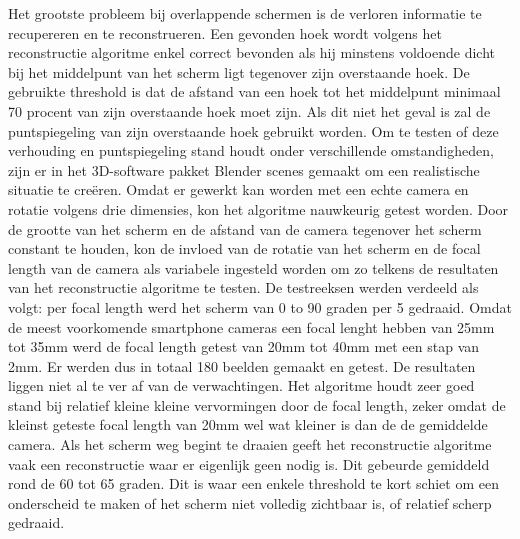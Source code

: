 Het grootste probleem bij overlappende schermen is de verloren informatie te recupereren en te reconstrueren. Een gevonden hoek wordt volgens het reconstructie algoritme enkel correct bevonden als hij minstens voldoende dicht bij het middelpunt van het scherm ligt tegenover zijn overstaande hoek. De gebruikte threshold is dat de afstand van een hoek tot het middelpunt minimaal 70 procent van zijn overstaande hoek moet zijn. Als dit niet het geval is zal de puntspiegeling van zijn overstaande hoek gebruikt worden.
Om te testen of deze verhouding en puntspiegeling stand houdt onder verschillende omstandigheden, zijn er in het 3D-software pakket Blender scenes gemaakt om een realistische situatie te creëren. Omdat er gewerkt kan worden met een echte camera en rotatie volgens drie dimensies, kon het algoritme nauwkeurig getest worden. Door de grootte van het scherm en de afstand van de camera tegenover het scherm constant te houden, kon de invloed van de rotatie van het scherm en de focal length van de camera als variabele ingesteld worden om zo telkens de resultaten van het reconstructie algoritme te testen. De testreeksen werden verdeeld als volgt: per focal length werd het scherm van 0 to 90 graden per 5 gedraaid. Omdat de meest voorkomende smartphone cameras een focal lenght hebben van 25mm tot 35mm werd de focal length getest van 20mm tot 40mm met een stap van 2mm. Er werden dus in totaal 180 beelden gemaakt en getest.
De resultaten liggen niet al te ver af van de verwachtingen. Het algoritme houdt zeer goed stand bij relatief kleine kleine vervormingen door de focal length, zeker omdat de kleinst geteste focal length van 20mm wel wat kleiner is dan de de gemiddelde camera. Als het scherm weg begint te draaien geeft het reconstructie algoritme vaak een reconstructie waar er eigenlijk geen nodig is. Dit gebeurde gemiddeld rond de 60 tot 65 graden. Dit is waar een enkele threshold te kort schiet om een onderscheid te maken of het scherm niet volledig zichtbaar is, of relatief scherp gedraaid.